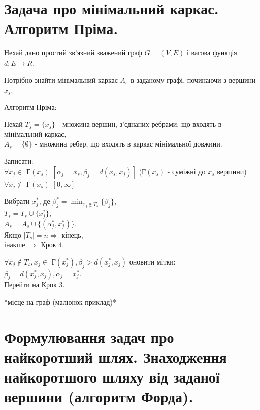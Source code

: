 \documentclass[12pt,a4paper]{article}
\newenvironment{slim_enumerate}{
\begin{enumerate}
  \setlength{\itemsep}{1pt}
  \setlength{\parskip}{0pt}
  \setlength{\parsep}{0pt}}
{\end{enumerate}}
\begin{document}

\pagestyle{empty}

\tableofcontents
\clearpage

\fontsize{14pt}{6mm}\selectfont

\section{Задача про мінімальний каркас. Алгоритм Пріма.}

Нехай дано простий зв’язний зважений граф $G=(V,E)$ і вагова функція $d:E\rightarrow R$.

Потрібно знайти мінімальний каркас $A_s$ в заданому графі, починаючи з вершини $x_s$.

Алгоритм Пріма:
\begin{slim_enumerate}
  \item Нехай $T_s = \{x_s\}$ - множина вершин, з’єднаних ребрами, що входять в мінімальний каркас,\\
$A_s = \{\emptyset\}$ - множина ребер, що входять в каркас мінімальної довжини.
  \item Записати:\\
$\forall x_j\in$ Г$(x_s)$ $[\alpha_j=x_s, \beta_j=d(x_s,x_j)]$ (Г$(x_s)$ - суміжні до $x_s$ вершини)\\
$\forall x_j\notin$ Г$(x_s)$ $[0,\infty]$
  \item Вибрати $x_j^*$, де $\beta_j^*=\displaystyle\min_{x_j\notin T_s}\{\beta_j\}$,\\
$T_s=T_s\cup\{x_j^*\}$,\\
$A_s=A_s\cup\{(\alpha_j^*,x_j^*)\}$.\\
Якщо $|T_s|=n\Rightarrow$ кінець,\\
інакше ${\Rightarrow}$ Крок 4.
  \item $\forall x_j\notin T_s, x_j\in$ Г$(x_j^*), \beta_j>d(x_j^*,x_j)$ оновити мітки:\\
$\beta_j=d(x_j^*,x_j), \alpha_j=x_j^*$.\\
Перейти на Крок 3.
\end{slim_enumerate}

*місце на граф (малюнок-приклад)*

\clearpage

\section{Формулювання задач про найкоротший шлях. Знаходження найкоротшого шляху від заданої вершини (алгоритм Форда).}
\end{document}
